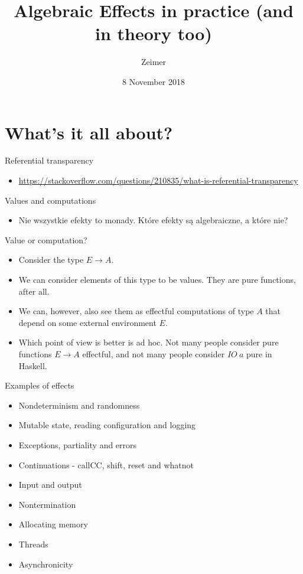 \documentclass{beamer}
\title{Algebraic Effects in practice (and in theory too)}
\author{Zeimer}
\date{8 November 2018}
\begin{document}
\frame{\titlepage}

\frame{\tableofcontents}

\section{What's it all about?}

\begin{frame}{Referential transparency}
\begin{itemize}
	\item \href{https://stackoverflow.com/questions/210835/what-is-referential-transparency}{https://stackoverflow.com/questions/210835/what-is-referential-transparency}
\end{itemize}
\end{frame}

\begin{frame}{Values and computations}
\begin{itemize}
	\item Nie wszystkie efekty to monady. Które efekty są algebraiczne, a które nie?
\end{itemize}
\end{frame}

\begin{frame}{Value or computation?}
\begin{itemize}
	\item Consider the type $E \to A$.
	\item We can consider elements of this type to be values. They are pure functions, after all.
	\item We can, however, also see them as effectful computations of type $A$ that depend on some external environment $E$.
	\item Which point of view is better is ad hoc. Not many people consider pure functions $E \to A$ effectful, and not many people consider $IO\ a$ pure in Haskell.
\end{itemize}
\end{frame}

\begin{frame}{Examples of effects}
\begin{itemize}
	\item Nondeterminism and randomness
	\item Mutable state, reading configuration and logging
	\item Exceptions, partiality and errors
	\item Continuations - callCC, shift, reset and whatnot
	\item Input and output
	\item Nontermination
	\item Allocating memory
	\item Threads
	\item Asynchronicity
\end{itemize}
\end{frame}
\end{document}
